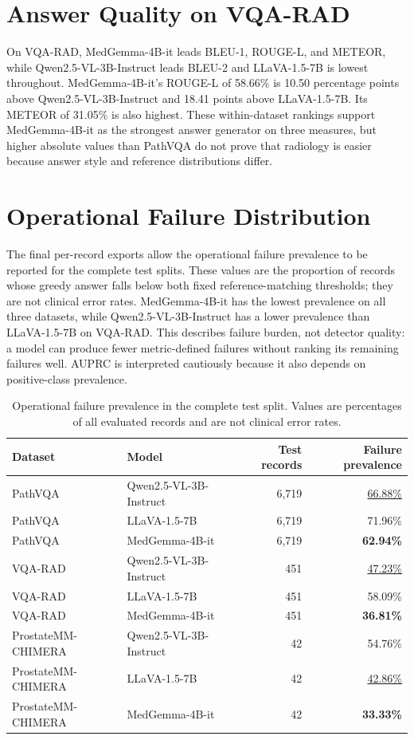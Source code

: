 \section{Answer Quality on VQA-RAD}

On VQA-RAD, MedGemma-4B-it leads BLEU-1, ROUGE-L, and METEOR, while Qwen2.5-VL-3B-Instruct leads BLEU-2 and LLaVA-1.5-7B is lowest throughout. MedGemma-4B-it's ROUGE-L of 58.66\% is 10.50 percentage points above Qwen2.5-VL-3B-Instruct and 18.41 points above LLaVA-1.5-7B. Its METEOR of 31.05\% is also highest. These within-dataset rankings support MedGemma-4B-it as the strongest answer generator on three measures, but higher absolute values than PathVQA do not prove that radiology is easier because answer style and reference distributions differ.

\section{Operational Failure Distribution}

The final per-record exports allow the operational failure prevalence to be reported for the complete test splits. These values are the proportion of records whose greedy answer falls below both fixed reference-matching thresholds; they are not clinical error rates. MedGemma-4B-it has the lowest prevalence on all three datasets, while Qwen2.5-VL-3B-Instruct has a lower prevalence than LLaVA-1.5-7B on VQA-RAD. This describes failure burden, not detector quality: a model can produce fewer metric-defined failures without ranking its remaining failures well. AUPRC is interpreted cautiously because it also depends on positive-class prevalence.

\begin{table}[htbp]
    \centering
    \caption{Operational failure prevalence in the complete test split. Values are percentages of all evaluated records and are not clinical error rates.}
    \label{tab:failure-prevalence}
    \begin{tabularx}{\textwidth}{lXrr}
        \toprule
        Dataset & Model & Test records & Failure prevalence \\
        \midrule
        PathVQA & Qwen2.5-VL-3B-Instruct & 6,719 & \underline{66.88\%} \\
        PathVQA & LLaVA-1.5-7B & 6,719 & 71.96\% \\
        PathVQA & MedGemma-4B-it & 6,719 & \textbf{62.94\%} \\
        VQA-RAD & Qwen2.5-VL-3B-Instruct & 451 & \underline{47.23\%} \\
        VQA-RAD & LLaVA-1.5-7B & 451 & 58.09\% \\
        VQA-RAD & MedGemma-4B-it & 451 & \textbf{36.81\%} \\
        ProstateMM-CHIMERA & Qwen2.5-VL-3B-Instruct & 42 & 54.76\% \\
        ProstateMM-CHIMERA & LLaVA-1.5-7B & 42 & \underline{42.86\%} \\
        ProstateMM-CHIMERA & MedGemma-4B-it & 42 & \textbf{33.33\%} \\
        \bottomrule
    \end{tabularx}
\end{table}

